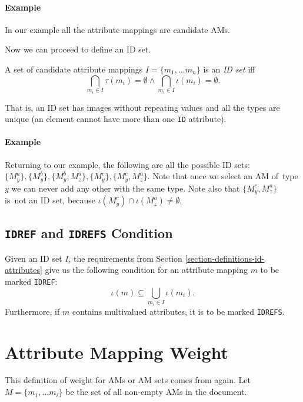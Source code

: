 \paragraph{Example}
In our example all the attribute mappings are candidate AMs.

Now we can proceed to define an ID set.

\begin{define}[ID set]
A set of candidate attribute mappings $I = \{m_1, \ldots m_n\}$ is an \textit{ID set} iff
\[\bigcap_{m_i \in I} \tau(m_i) = \emptyset \wedge \bigcap_{m_i \in I} \iota(m_i) = \emptyset.\]
\end{define}

That is, an ID set has images without repeating values and all the types are unique (an element cannot have more than one \texttt{ID} attribute).

\paragraph{Example}
Returning to our example, the following are all the possible ID sets: $\{ M_{y}^{a} \}, \{ M_{y}^{b} \}, \{ M_{y}^{b}, M_{z}^{a} \}, \{ M_{y}^{c} \}, \{ M_{y}^{c}, M_{z}^{a} \}$. Note that once we select an AM of~type $y$ we can never add any other with the same type. Note also that $\{ M_{y}^{c}, M_{z}^{a} \}$ is~not an ID set, because $\iota(M_{y}^{c}) \cap \iota(M_{z}^{a}) \neq \emptyset$.

\subsection*{\texttt{IDREF} and \texttt{IDREFS} Condition}

Given an ID set $I$, the requirements from Section \ref{section-definitions-id-attributes} give us the following condition for an attribute mapping $m$ to be marked \texttt{IDREF}:
\[\iota(m) \subseteq \bigcup_{m_i \in I} \iota(m_i).\]
Furthermore, if $m$ contains multivalued attributes, it is to be marked \texttt{IDREFS}.

\section{Attribute Mapping Weight}
\label{section-definitions-weight}

This definition of weight for AMs or AM sets comes from \cite{fidax} again. Let $M = \{m_1, \dots m_i\}$ be the set of all non-empty AMs in the document.


